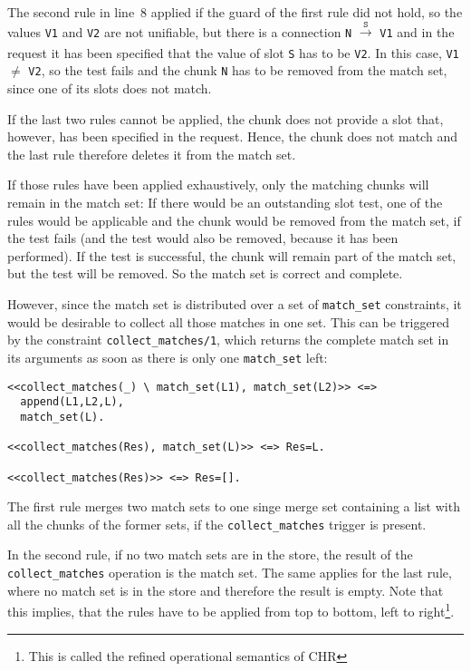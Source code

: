 The second rule in line~8 applied if the guard of the first rule did not hold, so the values \lstinline|V1| and \lstinline|V2| are not unifiable, but there is a connection \lstinline|N| $\xrightarrow[]{\mathtt{S}}$ \lstinline|V1| and in the request it has been specified that the value of slot \lstinline|S| has to be \lstinline|V2|. In this case, \lstinline|V1| $\neq$ \lstinline|V2|, so the test fails and the chunk \lstinline|N| has to be removed from the match set, since one of its slots does not match.

If the last two rules cannot be applied, the chunk does not provide a slot that, however, has been specified in the request. Hence, the chunk does not match and the last rule therefore deletes it from the match set. 

If those rules have been applied exhaustively, only the matching chunks will remain in the match set: If there would be an outstanding slot test, one of the rules would be applicable and the chunk would be removed from the match set, if the test fails (and the test would also be removed, because it has been performed). If the test is successful, the chunk will remain part of the match set, but the test will be removed. So the match set is correct and complete.

However, since the match set is distributed over a set of \lstinline|match_set| constraints, it would be desirable to collect all those matches in one set. This can be triggered by the constraint \lstinline|collect_matches/1|, which returns the complete match set in its arguments as soon as there is only one \lstinline|match_set| left:

\begin{lstlisting}
<<collect_matches(_) \ match_set(L1), match_set(L2)>> <=> 
  append(L1,L2,L), 
  match_set(L).
  
<<collect_matches(Res), match_set(L)>> <=> Res=L.

<<collect_matches(Res)>> <=> Res=[].
\end{lstlisting}

The first rule merges two match sets to one singe merge set containing a list with all the chunks of the former sets, if the \lstinline|collect_matches| trigger is present. 

In the second rule, if no two match sets are in the store, the result of the \lstinline|collect_matches| operation is the match set. The same applies for the last rule, where no match set is in the store and therefore the result is empty. Note that this implies, that the rules have to be applied from top to bottom, left to right\footnote{This is called the refined operational semantics of CHR}.

